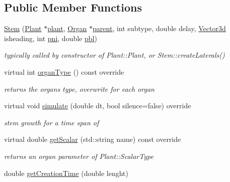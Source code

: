 \subsection*{Public Member Functions}
\begin{DoxyCompactItemize}
\item 
\hyperlink{classCPlantBox_1_1Stem_a6ae67c6b507172aae16733c79a9322a3}{Stem} (\hyperlink{classCPlantBox_1_1Plant}{Plant} $\ast$\hyperlink{classCPlantBox_1_1Organ_ac614456886ab270c6fd2617403e0f306}{plant}, \hyperlink{classCPlantBox_1_1Organ}{Organ} $\ast$\hyperlink{classCPlantBox_1_1Organ_a8ad90078d5ef859bd2ab71700854e286}{parent}, int subtype, double delay, \hyperlink{classCPlantBox_1_1Vector3d}{Vector3d} isheading, int \hyperlink{classCPlantBox_1_1Stem_a75d45d64ca2fb58989822c22e47d49f1}{pni}, double \hyperlink{classCPlantBox_1_1Stem_a8dcdb15ac2aecd71c7ae1c5b8882e72b}{pbl})
\begin{DoxyCompactList}\small\item\em typically called by constructor of Plant\+::\+Plant, or Stem\+::create\+Laterals() \end{DoxyCompactList}\item 
\mbox{\label{classCPlantBox_1_1Stem_a753c0401fe47b640ce594d682dcfdacc}} 
virtual int \hyperlink{classCPlantBox_1_1Stem_a753c0401fe47b640ce594d682dcfdacc}{organ\+Type} () const override
\begin{DoxyCompactList}\small\item\em returns the organs type, overwrite for each organ \end{DoxyCompactList}\item 
virtual void \hyperlink{classCPlantBox_1_1Stem_ad2f7f8607fe02dbe2f4d4335248cf90b}{simulate} (double dt, bool silence=false) override
\begin{DoxyCompactList}\small\item\em stem growth for a time span of \end{DoxyCompactList}\item 
virtual double \hyperlink{classCPlantBox_1_1Stem_ace47428771936118b0775ca9d23e5f4f}{get\+Scalar} (std\+::string name) const override
\begin{DoxyCompactList}\small\item\em returns an organ parameter of Plant\+::\+Scalar\+Type \end{DoxyCompactList}\item 
double \hyperlink{classCPlantBox_1_1Stem_af949f244eede3d43d189213e59e6ecc1}{get\+Creation\+Time} (double lenght)

\end{DoxyCompactItemize}
